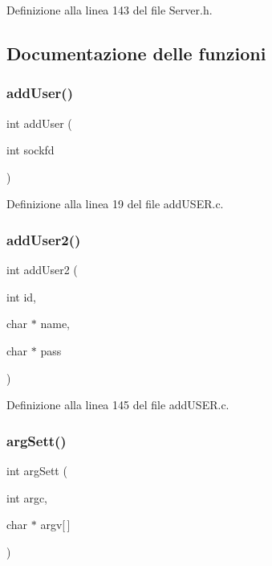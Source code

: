 Definizione alla linea 143 del file Server.\+h.



\subsection{Documentazione delle funzioni}
\mbox{\label{a00050_a3a8de8215b92820b1ceb58270cdc5f3c}} 
\subsubsection{\texorpdfstring{addUser()}{addUser()}}
{\footnotesize\ttfamily int add\+User (\begin{DoxyParamCaption}\item[{int}]{sockfd }\end{DoxyParamCaption})}



Definizione alla linea 19 del file add\+U\+S\+E\+R.\+c.

\mbox{\label{a00050_ae6d2192d8a6b146b46328f729f3f092b}} 
\subsubsection{\texorpdfstring{addUser2()}{addUser2()}}
{\footnotesize\ttfamily int add\+User2 (\begin{DoxyParamCaption}\item[{int}]{id,  }\item[{char $\ast$}]{name,  }\item[{char $\ast$}]{pass }\end{DoxyParamCaption})}



Definizione alla linea 145 del file add\+U\+S\+E\+R.\+c.

\mbox{\label{a00050_a169605f11035e9caf2dd6f0479c2dc18}} 
\subsubsection{\texorpdfstring{argSett()}{argSett()}}
{\footnotesize\ttfamily int arg\+Sett (\begin{DoxyParamCaption}\item[{int}]{argc,  }\item[{char $\ast$}]{argv\mbox{[}$\,$\mbox{]} }\end{DoxyParamCaption})}



